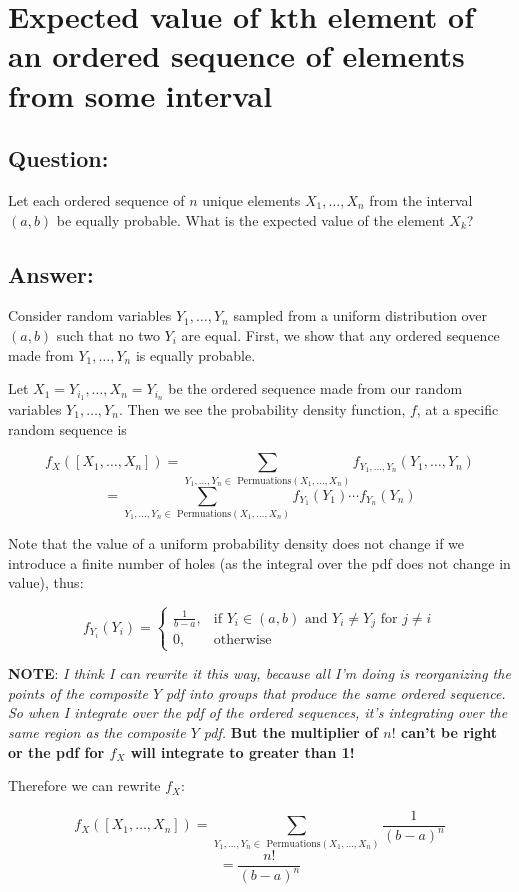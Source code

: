 \documentclass{article}
\begin{document}
\section{Expected value of kth element of an ordered sequence of elements from some interval}

\subsection{Question:}

Let each ordered sequence of $n$ unique elements $X_1, \dots, X_n$ from the interval $(a, b)$ be equally probable. What is the expected value of the element $X_k$?

\subsection{Answer:}

Consider random variables $Y_1, \dots, Y_n$ sampled from a uniform  distribution over $(a, b)$ such that no two $Y_i$ are equal. First, we show that any ordered sequence made from $Y_1, \dots, Y_n$ is equally probable.

Let $X_1 = Y_{i_1}, \dots, X_n = Y_{i_n}$ be the ordered sequence made from our random variables $Y_1, \dots, Y_n$. Then we see the probability density function, $f$, at a specific random sequence is

$$f_X([X_1, \dots, X_n]) = \sum_{Y_1, \dots, Y_n \in \text{ Permuations}(X_1, \dots, X_n)} f_{Y_1, \dots, Y_n}(Y_1, \dots, Y_n) $$
$$= \sum_{Y_1, \dots, Y_n \in \text{ Permuations}(X_1, \dots, X_n)} f_{Y_1}(Y_1)\cdots f_{Y_n}(Y_n)$$

Note that the value of a uniform probability density does not change if we introduce a finite number of holes (as the integral over the pdf does not change in value), thus:

$$
f_{Y_i}(Y_i) = 
\begin{cases}
\frac{1}{b-a},  & \text{if $Y_i \in (a, b)$ and $Y_i \neq Y_j$ for $j \neq i$} \\
0, & \text{otherwise}
\end{cases}
$$

\textbf{NOTE}: \emph{I think I can rewrite it this way, because all I'm doing is reorganizing the points of the composite $Y$ pdf into groups that produce the same ordered sequence. So when I integrate over the pdf of the ordered sequences, it's integrating over the same region as the composite $Y$ pdf.} \textbf{But the multiplier of $n!$ can't be right or the pdf for $f_X$ will integrate to greater than 1!}

Therefore we can rewrite $f_X$:

$$f_X([X_1, \dots, X_n]) = \sum_{Y_1, \dots, Y_n \in \text{ Permuations}(X_1, \dots, X_n)}  \frac{1}{(b-a)^n}$$
$$=\frac{n!}{(b-a)^n}$$
\end{document}
